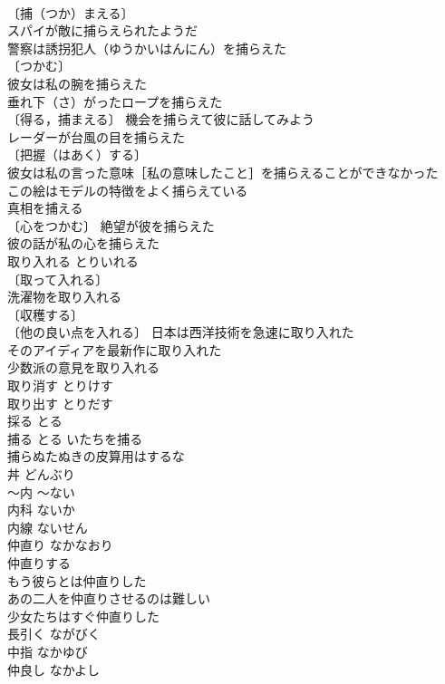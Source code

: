 \documentclass[8pt]{extreport}
\begin{document}
\begin{CJK}{UTF8}{min}
\\	〔捕（つか）まえる〕
\\	スパイが敵に捕らえられたようだ 
\\	警察は誘拐犯人（ゆうかいはんにん）を捕らえた 
\\	〔つかむ〕
\\	彼女は私の腕を捕らえた 
\\	垂れ下（さ）がったロープを捕らえた 
\\	〔得る，捕まえる〕 機会を捕らえて彼に話してみよう 
\\	レーダーが台風の目を捕らえた 
\\	〔把握（はあく）する〕
\\	彼女は私の言った意味［私の意味したこと］を捕らえることができなかった 
\\	この絵はモデルの特徴をよく捕らえている 
\\	真相を捕える 
\\	〔心をつかむ〕 絶望が彼を捕らえた 
\\	彼の話が私の心を捕らえた 
\\	取り入れる	とりいれる	
\\	〔取って入れる〕
\\	洗濯物を取り入れる 
\\	〔収穫する〕
\\	〔他の良い点を入れる〕 日本は西洋技術を急速に取り入れた 
\\	そのアイディアを最新作に取り入れた 
\\	少数派の意見を取り入れる 
\\	取り消す	とりけす	
\\	取り出す	とりだす	
\\	採る	とる	
\\	捕る	とる	いたちを捕る 
\\	捕らぬたぬきの皮算用はするな 
\\	丼	どんぶり	
\\	～内	～ない	
\\	内科	ないか	
\\	内線	ないせん	
\\	仲直り	なかなおり	
\\	仲直りする 
\\	もう彼らとは仲直りした 
\\	あの二人を仲直りさせるのは難しい 
\\	少女たちはすぐ仲直りした 
\\	長引く	ながびく	
\\	中指	なかゆび	
\\	仲良し	なかよし	

\end{CJK}
\end{document}
